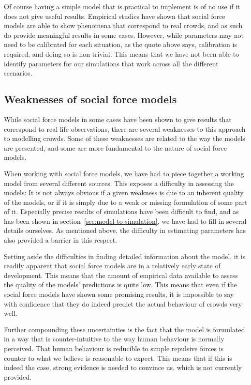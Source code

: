 Of course having a simple model that is practical to implement is of no use if 
it does not give useful results. Empirical studies have shown that social 
force models are able to show phenomena that correspond to real crowds, and as 
such do provide meaningful results in some cases. However, while parameters 
may not need to be calibrated for each situation, as the quote above says, 
calibration is required, and doing so is non-trivial. This means that we have 
not been able to identify parameters for our simulations that work across all 
the different scenarios.

\subsection{Weaknesses of social force models}
While social force models in some cases have been shown to give results that 
correspond to real life observations, there are several weaknesses to this 
approach to modelling crowds. Some of these weaknesses are related to the way 
the models are presented, and some are more fundamental to the nature of 
social force models.

When working with social force models, we have had to piece together a working 
model from several different sources. This exposes a difficulty in assessing 
the models: It is not always obvious if a given weakness is due to an inherent 
quality of the models, or if it is simply due to a weak or missing formulation 
of some part of it. Especially precise results of simulations have been 
difficult to find, and as has been shown in 
section~\ref{sec:model-to-simulation}, we have had to fill in several details 
ourselves. As mentioned above, the difficulty in estimating parameters has 
also provided a barrier in this respect.

Setting aside the difficulties in finding detailed information about the 
model, it is readily apparent that social force models are in a relatively 
early state of development. This means that the amount of empirical data 
available to assess the quality of the models' predictions is quite low. This 
means that even if the social force models have shown some promising results, 
it is impossible to say with confidence that they do indeed predict the actual 
behaviour of crowds very well.

Further compounding these uncertainties is the fact that the model is 
formulated in a way that is counter-intuitive to the way human behaviour is 
normally perceived. That human behaviour is reducible to simple repulsive 
forces is counter to what we believe is reasonable to expect. This means that 
if this is indeed the case, strong evidence is needed to convince us, which is 
not currently provided.

